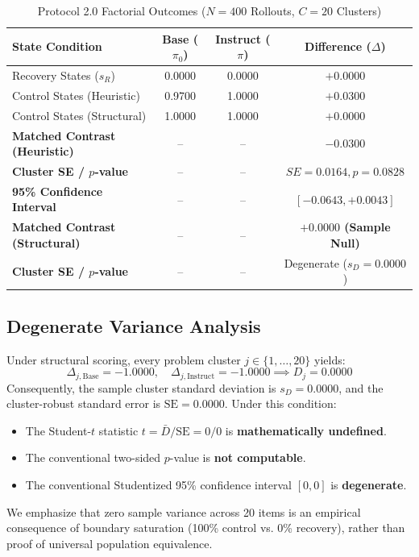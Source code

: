 \documentclass[10pt,conference]{IEEEtran}
\begin{document}
\begin{table}[htbp]
\caption{Protocol 2.0 Factorial Outcomes ($N=400$ Rollouts, $C=20$ Clusters)}
\label{tab:outcomes}
\centering
\begin{tabular}{lccc}
\toprule
\textbf{State Condition} & \textbf{Base ($\pi_0$)} & \textbf{Instruct ($\pi$)} & \textbf{Difference ($\Delta$)} \\
\midrule
Recovery States ($s_R$) & 0.0000 & 0.0000 & $+0.0000$ \\
Control States (Heuristic) & 0.9700 & 1.0000 & $+0.0300$ \\
Control States (Structural) & 1.0000 & 1.0000 & $+0.0000$ \\
\midrule
\textbf{Matched Contrast (Heuristic)} & -- & -- & \textbf{$-0.0300$} \\
\textbf{Cluster SE / $p$-value} & -- & -- & $SE = 0.0164, p = 0.0828$ \\
\textbf{95\% Confidence Interval} & -- & -- & $[-0.0643, +0.0043]$ \\
\midrule
\textbf{Matched Contrast (Structural)} & -- & -- & \textbf{$+0.0000$ (Sample Null)} \\
\textbf{Cluster SE / $p$-value} & -- & -- & Degenerate ($s_D = 0.0000$) \\
\bottomrule
\end{tabular}
\end{table}

\subsection{Degenerate Variance Analysis}
Under structural scoring, every problem cluster $j \in \{1, \dots, 20\}$ yields:
$$\Delta_{j, \text{Base}} = -1.0000, \quad \Delta_{j, \text{Instruct}} = -1.0000 \implies D_j = 0.0000$$
Consequently, the sample cluster standard deviation is $s_D = 0.0000$, and the cluster-robust standard error is $\mathrm{SE} = 0.0000$. Under this condition:
\begin{itemize}
    \item The Student-$t$ statistic $t = \bar{D} / \mathrm{SE} = 0/0$ is \textbf{mathematically undefined}.
    \item The conventional two-sided $p$-value is \textbf{not computable}.
    \item The conventional Studentized 95\% confidence interval $[0, 0]$ is \textbf{degenerate}.
\end{itemize}
We emphasize that zero sample variance across 20 items is an empirical consequence of boundary saturation (100\% control vs. 0\% recovery), rather than proof of universal population equivalence.
\end{document}
